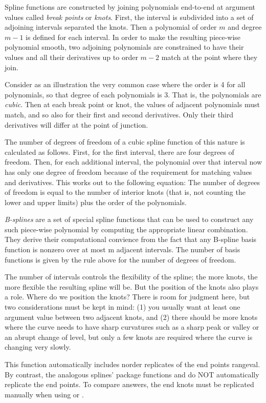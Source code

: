 \begin{Details}\relax
Spline functions are constructed by joining polynomials end-to-end at
argument values called \emph{break points} or \emph{knots}. First, the
interval is subdivided into a set of adjoining intervals
separated the knots.  Then a polynomial of order $m$ and
degree $m-1$ is defined for each interval.  In order to make the
resulting piece-wise polynomial smooth, two adjoining polynomials are
constrained to have their values and all their derivatives up to order
$m-2$ match at the point where they join.

Consider as an illustration the very common case where the order is 4 
for all polynomials, so that degree of each polynomials is 3.  That
is, the polynomials are \emph{cubic}.  Then at each break point or
knot, the values of adjacent polynomials must match, and so also for
their first and second derivatives.  Only their third derivatives will
differ at the point of junction.

The number of degrees of freedom of a cubic spline function of this
nature is calculated as follows.  First, for the first interval, there
are four degrees of freedom.  Then, for each additional interval, the
polynomial over that interval now has only one degree of freedom
because of the requirement for matching values and derivatives.  This
works out to the following equation:  The number of degrees of freedom
is equal to the number of interior knots (that is, not counting the
lower and upper limits) plus the order of the polynomials.

\emph{B-splines} are a set of special spline functions that can be
used to construct any such piece-wise polynomial by computing the
appropriate linear combination.  They derive their computational
convience from the fact that any B-spline basis function is nonzero
over at most m adjacent intervals.  The number of basis functions is
given by the rule above for the number of degrees of freedom.

The number of intervals controls the flexibility of the spline;  the
more knots, the more flexible the resulting spline will be. But the 
position of the knots also plays a role.  Where do we position the
knots?  There is room for judgment here, but two considerations must
be kept in mind:  (1) you usually want at least one argument value
between two adjacent knots, and (2)  there should be more knots where
the curve needs to have sharp curvatures such as a sharp peak or
valley or an abrupt change of level, but only a few knots are required
where the curve is changing very slowly.

This function automatically includes norder replicates of the end
points rangeval.  By contrast, the analogous splines' package
functions  and 
do NOT automatically replicate the end points.  To compare answers,
the end knots must be replicated manually when using
 or .
\end{Details}
